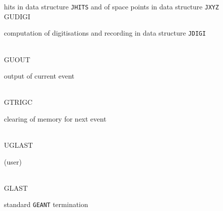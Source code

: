 \begin{tabbing}
{hits in data structure {\tt JHITS} and of space points in data structure
{\tt JXYZ} \vspace{.20cm}} \\
  \> \> \> GUDIGI \> \> \> \> \> \> \parbox[t]{7.5cm}{computation of
digitisations and recording in data structure {\tt JDIGI} \vspace{.20cm}} \\
  \> \> \> GUOUT \> \> \> \> \> \> \parbox[t]{7.5cm}{output of current
event \vspace{.20cm}} \\
  \> \> GTRIGC \> \> \> \> \> \> \> \parbox[t]{7.5cm}{clearing of memory
for next event \vspace{.20cm}} \\
  \> UGLAST \> \> \> \> \> \> \> \> \parbox[t]{7.5cm}{(user) \vspace{.20cm}} \\
  \> \> GLAST \> \> \> \> \> \> \> \parbox[t]{7.5cm}{standard {\tt GEANT}
termination \vspace{.20cm}} \\

\end{tabbing}


 
